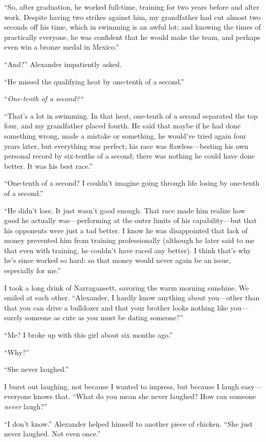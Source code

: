 ``So, after graduation, he worked full-time, training for two years
before and after work. Despite having two strikes against him, my
grandfather had cut almost two seconds off his time, which in swimming
is an awful lot; and knowing the times of practically everyone, he was
confident that he would make the team, and perhaps even win a bronze
medal in Mexico.''

``And?'' Alexander impatiently asked.

``He missed the qualifying heat by one-tenth of a second.''

``\emph{One-tenth of a second?{}``}

``That's a lot in swimming. In that heat, one-tenth of a second
separated the top four, and my grandfather placed fourth. He said that
maybe if he had done something wrong, made a mistake or something, he
would've tried again four years later, but everything was perfect; his
race was flawless---besting his own personal record by six-tenths of a
second; there was nothing he could have done better. It was his best
race.''

``One-tenth of a second? I couldn't imagine going through life losing by
one-tenth of a second.''

``He didn't lose. It just wasn't good enough. That race made him realize
how good he actually was---performing at the outer limits of his
capability---but that his opponents were just a tad better. I know he
was disappointed that lack of money prevented him from training
professionally (although he later said to me that even with training, he
couldn't have raced any better). I think that's why he's since worked so
hard: so that money would never again be an issue, especially for me.''

I took a long drink of Narragansett, savoring the warm morning sunshine.
We smiled at each other. ``Alexander, I hardly know anything about
you---other than that you can drive a bulldozer and that your brother
looks nothing like you---surely someone as cute as you must be dating
someone?''

``Me? I broke up with this girl about six months ago.''

``Why?''

``She never laughed.''

I burst out laughing, not because I wanted to impress, but because I
laugh easy---everyone knows that. ``What do you mean she never laughed?
How can someone \emph{never} laugh?''

``I don't know.'' Alexander helped himself to another piece of chicken.
``She just never laughed. Not even once.''

